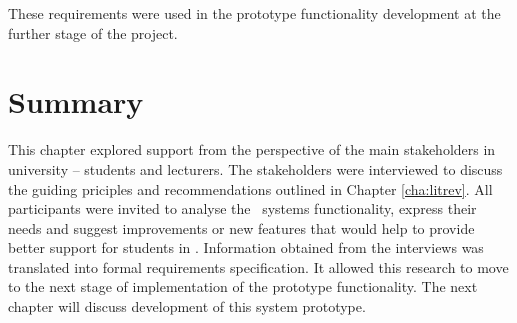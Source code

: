 These requirements were used in the prototype functionality development at the
further stage of the project.

\section{Summary}

This chapter explored \LLLs support from the perspective of the main
stakeholders in university -- students and lecturers. The stakeholders were
interviewed to discuss the guiding priciples and recommendations outlined in
Chapter \ref{cha:litrev}. All participants were invited to analyse the
\ep~systems functionality, express their needs and suggest improvements or new
features that would help to provide better support for students in \LLLsn.
Information obtained from the interviews was translated into formal requirements
specification. It allowed this research to move to the next stage of
implementation of the prototype functionality. The next chapter will discuss
development of this system prototype.

